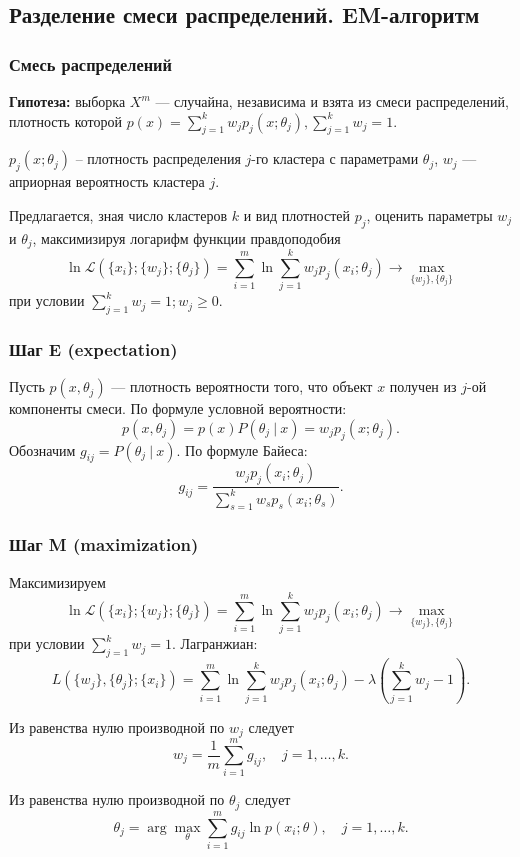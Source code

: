 \documentclass[12pt,pdf,notheorems]{beamer}
\renewcommand{\geq}{\geqslant}
\begin{document}
\subsection[Разделение смеси распределений. EM-алгоритм]{Разделение смеси распределений. EM-алгоритм}

\begin{frame}
	\frametitle{Смесь распределений}
	\textbf{Гипотеза:} выборка $X^m$ --- случайна, независима и взята из смеси распределений, плотность которой $p(x) = \sum_{j=1}^k w_j p_j(x;\theta_j), \sum_{j=1}^k w_j = 1$. 
\medskip

	$p_j(x;\theta_j)$ -- плотность распределения $j$-го кластера с параметрами $\theta_j$, 
	$w_j$ --- априорная вероятность кластера $j$.
\end{frame}

	\begin{frame}
	Предлагается, зная число кластеров $k$ и вид плотностей $p_j$, оценить параметры $w_j$ и $\theta_j$, 
	максимизируя логарифм функции правдоподобия 
		$$\ln \mathcal{L}(\{x_i\}; \{w_j\}; \{\theta_j\}) = \sum_{i=1}^m \ln \sum_{j=1}^k w_j p_j(x_i; \theta_j) \rightarrow \max_{\{w_j\}, \{\theta_j\}}$$ 
	при условии $\sum_{j=1}^k w_j =1; w_j \geq 0$.
\end{frame}

\begin{frame}
	\frametitle{Шаг E (expectation)} Пусть $p(x, \theta_j)$ --- плотность вероятности того, что объект $x$ получен из $j$-ой компоненты смеси.
	По формуле условной вероятности: $$p(x, \theta_j) = p(x) P(\theta_j~|~x) = w_j p_j(x; \theta_j).$$ Обозначим $g_{ij}= P(\theta_j~|~x)$. 
	По формуле Байеса:
	$$g_{ij} = \frac{w_j p_j(x_i; \theta_j)}{\sum_{s=1}^k w_{s} p_{s}(x_i; \theta_s) }.$$
\end{frame}

\begin{frame}
	\frametitle{Шаг M (maximization)} Максимизируем $$\ln \mathcal{L}(\{x_i\}; \{w_j\}; \{\theta_j\}) = \sum_{i=1}^m \ln \sum_{j=1}^k w_j p_j(x_i; \theta_j) \rightarrow \max_{\{w_j\}, \{\theta_j\}}$$
	при условии $\sum_{j=1}^k w_j =1$.
	Лагранжиан:
	$$L(\{w_j\}, \{ \theta_j\} ; \{x_i\}) = \sum_{i=1}^m \ln \sum_{j=1}^k w_j p_j(x_i; \theta_j) - \lambda \left( \sum_{j=1}^k w_j - 1 \right).$$
\end{frame}

\begin{frame}
	Из равенства нулю производной по $w_j$ следует $$w_j = \frac{1}{m} \sum_{i=1}^m g_{ij}, \quad j=1, \dots, k.$$

	Из равенства нулю производной по $\theta_j$ следует $$\theta_j = \arg \max_\theta \sum_{i=1}^m g_{ij} \ln p(x_i; \theta), \quad j=1, \dots, k.$$
\end{frame}
\end{document}
